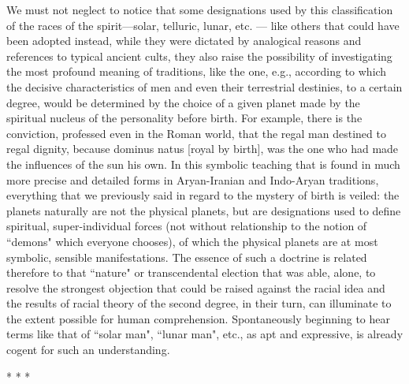 We must not neglect to notice that some designations used by this classification of the races of the spirit—solar, telluric, lunar, etc. — like others that could have been adopted instead, while they were dictated by analogical reasons and references to typical ancient cults, they also raise the possibility of investigating the most profound meaning of traditions, like the one, e.g., according to which the decisive characteristics of men and even their terrestrial destinies, to a certain degree, would be determined by the choice of a given planet made by the spiritual nucleus of the personality before birth. For example, there is the conviction, professed even in the Roman world, that the regal man destined to regal dignity, because dominus natus [royal by birth], was the one who had made the influences of the sun his own. In this symbolic teaching that is found in much more precise and detailed forms in Aryan-Iranian and Indo-Aryan traditions, everything that we previously said in regard to the mystery of birth is veiled: the planets naturally are not the physical planets, but are designations used to define spiritual, super-individual forces (not without relationship to the notion of ``demons" which everyone chooses), of which the physical planets are at most symbolic, sensible manifestations. The essence of such a doctrine is related therefore to that ``nature" or transcendental election that was able, alone, to resolve the strongest objection that could be raised against the racial idea and the results of racial theory of the second degree, in their turn, can illuminate to the extent possible for human comprehension. Spontaneously beginning to hear terms like that of ``solar man", ``lunar man", etc., as apt and expressive, is already cogent for such an understanding.




\begin{center}* * *\end{center}

